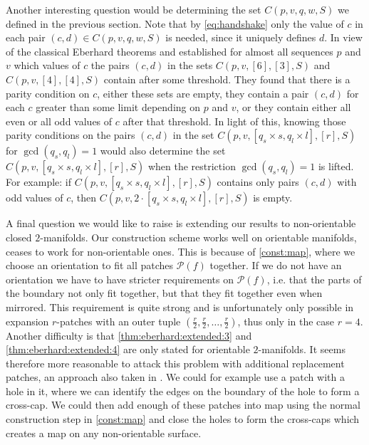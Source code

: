 Another interesting question would be determining the set $C(p, v, q, w, S)$ we defined in the previous section. Note that by \eqref{eq:handshake} only the value of $c$ in each pair $(c, d) \in C(p, v, q, w, S)$ is needed, since it uniquely defines $d$. In view of the classical {\sc Eberhard} theorems \cite{jendrol1993face} and \cite{jucovivc1976face} established for almost all sequences $p$ and $v$ which values of $c$ the pairs $(c, d)$ in the sets $C(p, v, [6], [3], S)$ and $C(p, v, [4], [4], S)$ contain after some threshold. They found that there is a parity condition on $c$, either these sets are empty, they contain a pair $(c, d)$ for each $c$ greater than some limit depending on $p$ and $v$, or they contain either all even or all odd values of $c$ after that threshold. In light of this, knowing those parity conditions on the pairs $(c, d)$ in the set $C(p, v, [q_s \times s, q_l \times l], [r], S)$ for $\gcd(q_s, q_l) = 1$ would also determine the set $C(p, v, [q_s \times s, q_l \times l], [r], S)$ when the restriction $\gcd(q_s, q_l) = 1$ is lifted. For example: if $C(p, v, [q_s \times s, q_l \times l], [r], S)$ contains only pairs $(c, d)$ with odd values of $c$, then $C(p, v, 2 \cdot [q_s \times s, q_l \times l], [r], S)$ is empty.

A final question we would like to raise is extending our results to non-orientable closed $2$-manifolds. Our construction scheme works well on orientable manifolds, ceases to work for non-orientable ones. This is because of \autoref{const:map}, where we choose an orientation to fit all patches $\mathcal{P}(f)$ together. If we do not have an orientation we have to have stricter requirements on $\mathcal{P}(f)$, i.e. that the parts of the boundary not only fit together, but that they fit together even when mirrored. This requirement is quite strong and is unfortunately only possible in expansion $r$-patches with an outer tuple $(\frac{r}{2}, \frac{r}{2}, \dots, \frac{r}{2})$, thus only in the case $r = 4$. Another difficulty is that \autoref{thm:eberhard:extended:3} and \autoref{thm:eberhard:extended:4} are only stated for orientable $2$-manifolds. It seems therefore more reasonable to attack this problem with additional replacement patches, an approach also taken in \cite{devos2010eberhard}. We could for example use a patch with a hole in it, where we can identify the edges on the boundary of the hole to form a cross-cap. We could then add enough of these patches into map using the normal construction step in \autoref{const:map} and close the holes to form the cross-caps which creates a map on any non-orientable surface.
